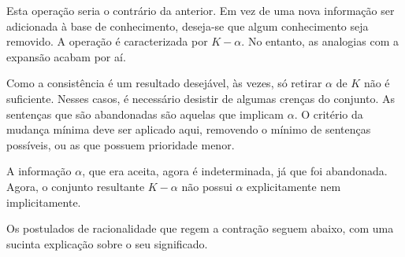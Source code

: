 Esta operação seria o contrário da anterior. Em vez de uma nova informação ser adicionada à base de conhecimento, deseja-se que algum conhecimento seja removido. A operação é caracterizada por $ K - \alpha $. No entanto, as analogias com a expansão acabam por aí.

Como a consistência é um resultado desejável, às vezes, só retirar $ \alpha $ de $ K $ não é suficiente. Nesses casos, é necessário desistir de algumas crenças do conjunto. As sentenças que são abandonadas são aquelas que implicam $ \alpha $. O critério da mudança mínima deve ser aplicado aqui, removendo o mínimo de sentenças possíveis, ou as que possuem prioridade menor.

A informação $ \alpha $, que era aceita, agora é indeterminada, já que foi abandonada. Agora, o conjunto resultante $ K - \alpha $ não possui $ \alpha $ explicitamente nem implicitamente. 

Os postulados de racionalidade que regem a contração seguem abaixo, com uma sucinta explicação sobre o seu significado.

